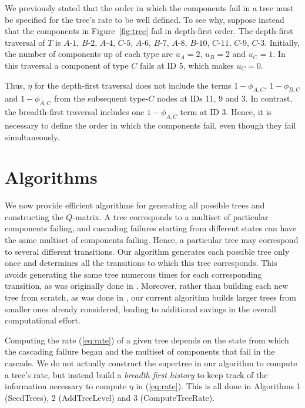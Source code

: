 \documentclass[12pt]{article}
\newcommand{\varName}[1]{\textrm{\it#1}}
\newcommand{\nodelabel}[2]{\mbox{$#1$-$#2$}}
\begin{document}
We previously stated that the order in which the components fail in a tree must be specified for the tree's rate to  be well defined. To see why, suppose instead that the components in Figure~\ref{fig:tree} fail
in depth-first order. The depth-first traversal of $T$ is \nodelabel{A}{1}, \nodelabel{B}{2}, \nodelabel{A}{4}, \nodelabel{C}{5}, \nodelabel{A}{6}, \nodelabel{B}{7}, \nodelabel{A}{8}, \nodelabel{B}{10}, \nodelabel{C}{11}, \nodelabel{C}{9}, \nodelabel{C}{3}. Initially, the number of components up of each type are $u_A = 2$, $u_B = 2$ and $u_C = 1$. In this traversal a component of type $C$ fails at ID 5, which makes $u_C = 0$.

Thus, $\eta$ for the depth-first traversal does not include the terms $1-\phi_{A,C}$, $1-\phi_{B,C}$ and $1-\phi_{A,C}$ from the subsequent type-$C$ nodes at IDs 11, 9 and 3. In contrast, the breadth-first traversal includes one $1-\phi_{A,C}$ term at ID 3. Hence, it is necessary to define the order in which the components fail, even though they fail simultaneously.

\section{Algorithms}
\label{sec:alg}

We now provide efficient algorithms for generating all possible trees and constructing the $Q$-matrix. A tree corresponds to a multiset of particular components failing, and cascading failures starting from different states can have the same multiset of components failing. Hence, a particular tree may correspond to several different transitions. Our algorithm generates each possible tree only once and determines all the transitions to which this tree corresponds. This avoids generating the same tree numerous times for each corresponding transition, as was originally done in \cite{ING:2009}. Moreover, rather than building each new tree from scratch, as was done in \cite{ING:2009}, our current algorithm builds larger trees from smaller ones already considered, leading to additional savings in the overall computational effort.

Computing the rate (\ref{eq:rate}) of a given tree depends on the state from which the cascading failure began and the multiset of components that fail in the cascade. We do not actually construct the supertree in our algorithm to compute a tree's rate, but instead build a \varName{breadth-first history} to keep track of the information necessary to compute $\eta$ in (\ref{eq:rate}). This is all done in Algorithms 1 (SeedTrees), 2 \mbox{(AddTreeLevel)} and 3 (ComputeTreeRate).
\end{document}
